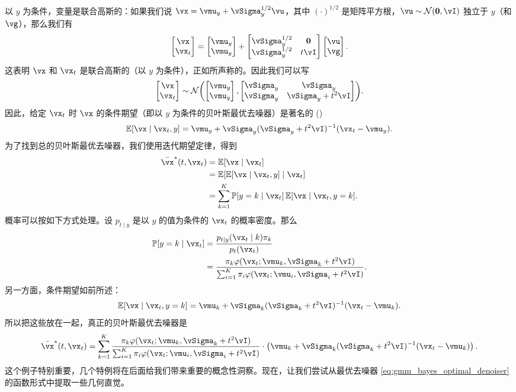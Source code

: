 \documentclass[../../book-main_zh.tex]{subfiles}
\begin{document}
\begin{example}[从高斯混合模型中去噪高斯噪声]
	以 \(y\) 为条件，变量是联合高斯的：如果我们说 \(\vx = \vmu_{y} + \vSigma_{y}^{1/2}\vu\)，其中 \((\cdot)^{1/2}\) 是矩阵平方根，\(\vu \sim \dNorm(\vzero, \vI)\) 独立于 \(y\)（和 \(\vg\)），那么我们有
	\begin{equation}
		\mat{\vx \\ \vx_{t}} = \mat{\vmu_{y} \\ \vmu_{y}} + \mat{\vSigma_{y}^{1/2} & \vzero \\ \vSigma_{y}^{1/2} & t\vI}\mat{\vu \\ \vg}.
	\end{equation}
	这表明 \(\vx\) 和 \(\vx_{t}\) 是联合高斯的（以 \(y\) 为条件），正如所声称的。因此我们可以写
	\begin{equation}
		\mat{\vx \\ \vx_{t}} \sim \dNorm\rp{\mat{\vmu_{y} \\ \vmu_{y}}, \mat{\vSigma_{y} & \vSigma_{y} \\ \vSigma_{y} & \vSigma_{y} + t^{2}\vI}}.
	\end{equation}
	因此，给定 \(\vx_{t}\) 时 \(\vx\) 的条件期望（即以 \(y\) 为条件的贝叶斯最优去噪器）是著名的
	()
	\begin{equation}
		\Ex[\vx \mid \vx_{t}, y] = \vmu_{y} + \vSigma_{y}(\vSigma_{y} + t^{2}\vI)^{-1}(\vx_{t} - \vmu_{y}).
	\end{equation}
	为了找到总的贝叶斯最优去噪器，我们使用迭代期望定律，得到
	\begin{align}
		\bar{\vx}^{\ast}(t, \vx_{t})
		&= \Ex[\vx \mid \vx_{t}] \\ 
		&= \Ex[\Ex[\vx \mid \vx_{t}, y] \mid \vx_{t}] \\ 
		&= \sum_{k = 1}^{K}\Pr[y = k \mid \vx_{t}]\Ex[\vx \mid \vx_{t}, y = k].
	\end{align}
	概率可以按如下方式处理。设 \(p_{t \mid y}\) 是以 \(y\) 的值为条件的 \(\vx_{t}\) 的概率密度。那么
	\begin{align}
		\Pr[y = k \mid \vx_{t}]
		&= \frac{p_{t \mid y}(\vx_{t} \mid k)\pi_{k}}{p_{t}(\vx_{t})} \\ 
		&= \frac{\pi_{k}\phi(\vx_{t} ; \vmu_{k}, \vSigma_{k}
		+ t^{2}\vI)}{\sum_{i = 1}^{K}\pi_{i}\phi(\vx_{t} ; \vmu_{i}, \vSigma_{i} + t^{2}\vI)}.
	\end{align}
	另一方面，条件期望如前所述：
	\begin{equation}
		\Ex[\vx \mid \vx_{t}, y = k] = \vmu_{k} + \vSigma_{k}(\vSigma_{k} + t^{2}\vI)^{-1}(\vx_{t} - \vmu_{k}).
	\end{equation}
	所以把这些放在一起，真正的贝叶斯最优去噪器是
	\begin{equation}\label{eq:gmm_bayes_optimal_denoiser}
		\bar{\vx}^{\ast}(t, \vx_{t}) = \sum_{k = 1}^{K}\frac{\pi_{k}\phi(\vx_{t}
		;\vmu_{k}, \vSigma_{k} + t^{2}\vI)}{\sum_{i = 1}^{K}\pi_{i}\phi(\vx_{t}
		;\vmu_{i}, \vSigma_{i} + t^{2}\vI)}\cdot\bp{\vmu_{k} + \vSigma_{k}(\vSigma_{k} + t^{2}\vI)^{-1}(\vx_{t} - \vmu_{k})}.
	\end{equation}
	这个例子特别重要，几个特例将在后面给我们带来重要的概念性洞察。现在，让我们尝试从最优去噪器 \eqref{eq:gmm_bayes_optimal_denoiser} 的函数形式中提取一些几何直觉。


\end{example}
\end{document}
